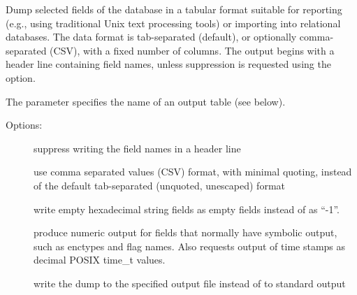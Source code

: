 \documentclass[letterpaper,10pt,english]{sphinxmanual}
\begin{document}
Dump selected fields of the database in a tabular format suitable for
reporting (e.g., using traditional Unix text processing tools) or
importing into relational databases.  The data format is tab-separated
(default), or optionally comma-separated (CSV), with a fixed number of
columns.  The output begins with a header line containing field names,
unless suppression is requested using the  option.

The  parameter specifies the name of an output table (see
below).

Options:
\begin{description}
\item[{}] \leavevmode
suppress writing the field names in a header line

\item[{}] \leavevmode
use comma separated values (CSV) format, with minimal quoting,
instead of the default tab-separated (unquoted, unescaped) format

\item[{}] \leavevmode
write empty hexadecimal string fields as empty fields instead of
as “-1”.

\item[{}] \leavevmode
produce numeric output for fields that normally have symbolic
output, such as enctypes and flag names.  Also requests output of
time stamps as decimal POSIX time\_t values.

\item[{ }] \leavevmode
write the dump to the specified output file instead of to standard
output

\end{description}
\end{document}
